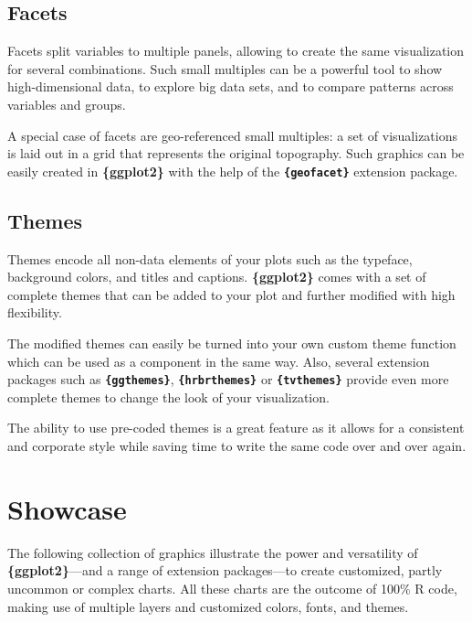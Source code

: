 \documentclass[
]{krantz}
\begin{document}
\hypertarget{facets}{%
\subsection{Facets}\label{facets}}

Facets split variables to multiple panels, allowing to create the same visualization for several combinations. Such small multiples can be a powerful tool to show high-dimensional data, to explore big data sets, and to compare patterns across variables and groups.

A special case of facets are geo-referenced small multiples: a set of visualizations is laid out in a grid that represents the original topography. Such graphics can be easily created in \textbf{\{ggplot2\}} with the help of the \textbf{\texttt{\{geofacet\}}} extension package.

\hypertarget{themes}{%
\subsection{Themes}\label{themes}}

Themes encode all non-data elements of your plots such as the typeface, background colors, and titles and captions. \textbf{\{ggplot2\}} comes with a set of complete themes that can be added to your plot and further modified with high flexibility.

The modified themes can easily be turned into your own custom theme function which can be used as a component in the same way. Also, several extension packages such as \textbf{\texttt{\{ggthemes\}}}, \textbf{\texttt{\{hrbrthemes\}}} or \textbf{\texttt{\{tvthemes\}}} provide even more complete themes to change the look of your visualization.

The ability to use pre-coded themes is a great feature as it allows for a consistent and corporate style while saving time to write the same code over and over again.

\hypertarget{showcase}{%
\section{Showcase}\label{showcase}}

The following collection of graphics illustrate the power and versatility of \textbf{\{ggplot2\}}---and a range of extension packages---to create customized, partly uncommon or complex charts. All these charts are the outcome of 100\% R code, making use of multiple layers and customized colors, fonts, and themes.
\end{document}
